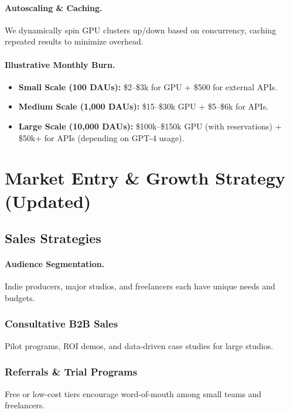\documentclass[11pt]{article}
\begin{document}
\paragraph{Autoscaling \& Caching.}
We dynamically spin GPU clusters up/down based on concurrency, caching repeated results to minimize overhead.

\paragraph{Illustrative Monthly Burn.}
\begin{itemize}
    \item \textbf{Small Scale (100 DAUs):} \$2--\$3k for GPU + \$500 for external APIs.
    \item \textbf{Medium Scale (1,000 DAUs):} \$15--\$30k GPU + \$5--\$6k for APIs.
    \item \textbf{Large Scale (10,000 DAUs):} \$100k--\$150k GPU (with reservations) + \$50k+ for APIs (depending on GPT-4 usage).
\end{itemize}

\section{Market Entry \& Growth Strategy (Updated)}

\subsection{Sales Strategies}
\paragraph{Audience Segmentation.} Indie producers, major studios, and freelancers each have unique needs and budgets.

\subsubsection{Consultative B2B Sales}
Pilot programs, ROI demos, and data-driven case studies for large studios.

\subsubsection{Referrals \& Trial Programs}
Free or low-cost tiers encourage word-of-mouth among small teams and freelancers.
\end{document}
